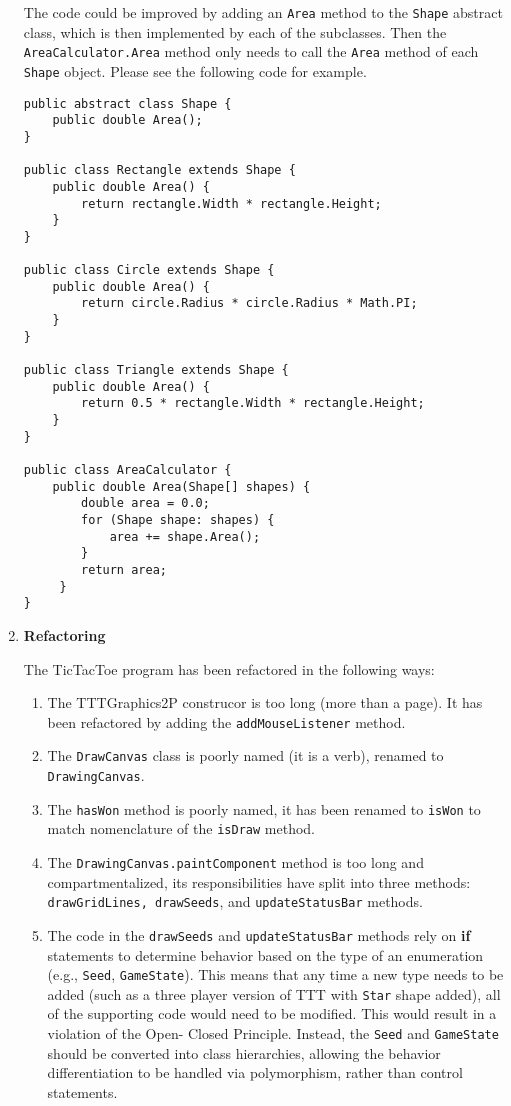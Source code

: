 \documentclass{report}
\begin{document}
\begin{enumerate}
	The code could be improved by adding an \texttt{Area} method to the
	\texttt{Shape} abstract class, which is then implemented by each of the
	subclasses. Then the \texttt{AreaCalculator.Area} method only needs to
	call the \texttt{Area} method of each \texttt{Shape} object. Please see
	the following code for example.
	
	\begin{verbatim}
public abstract class Shape {
    public double Area();
}
    
public class Rectangle extends Shape {
    public double Area() {
        return rectangle.Width * rectangle.Height;
    }
}
    
public class Circle extends Shape {
    public double Area() {
        return circle.Radius * circle.Radius * Math.PI;
    }
}
    
public class Triangle extends Shape {
    public double Area() {
        return 0.5 * rectangle.Width * rectangle.Height;
    }
}

public class AreaCalculator {
    public double Area(Shape[] shapes) {
        double area = 0.0;
        for (Shape shape: shapes) {
            area += shape.Area();
        }
        return area;
     }
}
	\end{verbatim}

	\item \textbf{Refactoring}

    The TicTacToe program has been refactored in the following ways:
    
    \begin{enumerate}
\item The TTTGraphics2P construcor is too long (more than a page). It has been 
refactored by adding the \texttt{addMouseListener} method.
 
\item The \texttt{DrawCanvas} class is poorly named (it is a verb), renamed to
\texttt{DrawingCanvas}.
 
\item The \texttt{hasWon} method is poorly named, it has been renamed to \texttt{isWon}
to match nomenclature of the \texttt{isDraw} method.
 
\item The \texttt{DrawingCanvas.paintComponent} method is too long and compartmentalized,
its responsibilities have split into three methods: \texttt{drawGridLines, drawSeeds}, and
\texttt{updateStatusBar} methods.
 
\item The code in the \texttt{drawSeeds} and \texttt{updateStatusBar} methods rely on
\textbf{if} statements to determine behavior based on the type of an enumeration (e.g., \texttt{Seed}, \texttt{GameState}). This means that any time a new type needs to be
added (such as a three player version of TTT with \texttt{Star} shape added), all of the supporting code would need to be modified. This would result in a violation of the Open-
Closed Principle. Instead, the \texttt{Seed} and \texttt{GameState} should be converted
into class hierarchies, allowing the behavior differentiation to be handled via
polymorphism, rather than control statements.
 

\end{enumerate}
\end{enumerate}
\end{document}
